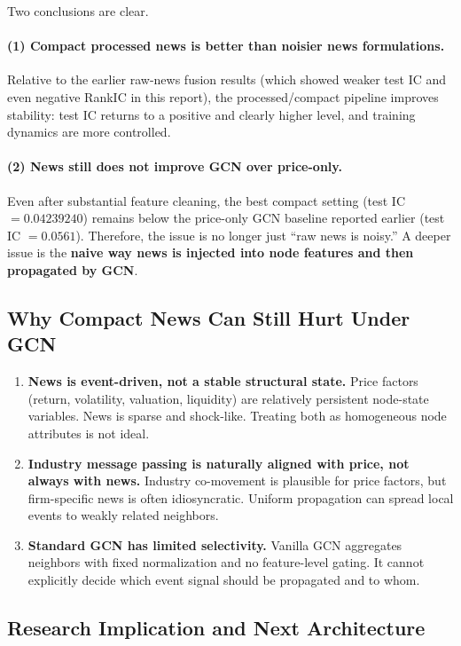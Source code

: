 Two conclusions are clear.

\paragraph{(1) Compact processed news is better than noisier news formulations.}
Relative to the earlier raw-news fusion results (which showed weaker test IC and even negative RankIC in this report), the processed/compact pipeline improves stability: test IC returns to a positive and clearly higher level, and training dynamics are more controlled.

\paragraph{(2) News still does not improve GCN over price-only.}
Even after substantial feature cleaning, the best compact setting (test IC $=0.04239240$) remains below the price-only GCN baseline reported earlier (test IC $=0.0561$). Therefore, the issue is no longer just ``raw news is noisy.'' A deeper issue is the \textbf{naive way news is injected into node features and then propagated by GCN}.

\subsection{Why Compact News Can Still Hurt Under GCN}

\begin{enumerate}
\item \textbf{News is event-driven, not a stable structural state.}
Price factors (return, volatility, valuation, liquidity) are relatively persistent node-state variables. News is sparse and shock-like. Treating both as homogeneous node attributes is not ideal.

\item \textbf{Industry message passing is naturally aligned with price, not always with news.}
Industry co-movement is plausible for price factors, but firm-specific news is often idiosyncratic. Uniform propagation can spread local events to weakly related neighbors.

\item \textbf{Standard GCN has limited selectivity.}
Vanilla GCN aggregates neighbors with fixed normalization and no feature-level gating. It cannot explicitly decide which event signal should be propagated and to whom.
\end{enumerate}

\subsection{Research Implication and Next Architecture}

